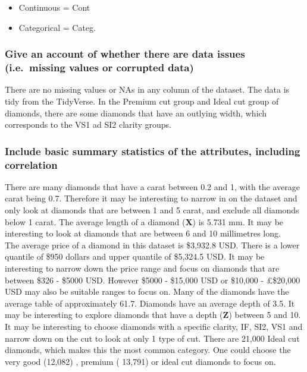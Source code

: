 \documentclass[
]{article}
\providecommand{\tightlist}{%
  \setlength{\itemsep}{0pt}\setlength{\parskip}{0pt}}
\begin{document}
\begin{itemize}
\tightlist
\item
  Continuous = Cont
\item
  Categorical = Categ.
\end{itemize}

\hypertarget{give-an-account-of-whether-there-are-data-issues-i.e.-missing-values-or-corrupted-data}{%
\subsubsection{Give an account of whether there are data issues
(i.e.~missing values or corrupted
data)}\label{give-an-account-of-whether-there-are-data-issues-i.e.-missing-values-or-corrupted-data}}

There are no missing values or NAs in any column of the dataset. The
data is tidy from the TidyVerse. In the Premium cut group and Ideal cut
group of diamonds, there are some diamonds that have an outlying width,
which corresponds to the VS1 ad SI2 clarity groups.

\hypertarget{include-basic-summary-statistics-of-the-attributes-including-correlation}{%
\subsubsection{Include basic summary statistics of the attributes,
including
correlation}\label{include-basic-summary-statistics-of-the-attributes-including-correlation}}

There are many diamonds that have a carat between 0.2 and 1, with the
average carat being 0.7. Therefore it may be interesting to narrow in on
the dataset and only look at diamonds that are between 1 and 5 carat,
and exclude all diamonds below 1 carat. The average length of a diamond
(\textbf{X}) is 5.731 mm. It may be interesting to look at diamonds that
are between 6 and 10 millimetres long.\\
The average price of a diamond in this dataset is \$3,932.8 USD. There
is a lower quantile of \$950 dollars and upper quantile of \$5,324.5
USD. It may be interesting to narrow down the price range and focus on
diamonds that are between \$326 - \$5000 USD. However \$5000 - \$15,000
USD or \$10,000 - £\$20,000 USD may also be suitable ranges to focus on.
Many of the diamonds have the average table of approximately 61.7.
Diamonds have an average depth of 3.5. It may be interesting to explore
diamonds that have a depth (\textbf{Z}) between 5 and 10. It may be
interesting to choose diamonds with a specific clarity, IF, SI2, VS1 and
narrow down on the cut to look at only 1 type of cut. There are 21,000
Ideal cut diamonds, which makes this the most common category. One could
choose the very good (12,082) , premium ( 13,791) or ideal cut diamonds
to focus on.
\end{document}
